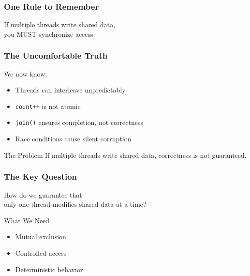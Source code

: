 \documentclass[aspectratio=169,11pt]{beamer}
\begin{document}
	\begin{frame}
		\frametitle{One Rule to Remember}
		\begin{center}
			\Large
			If multiple threads write shared data,\\
			you MUST synchronize access.
		\end{center}
	\end{frame}
	
	
	\begin{frame}
		\frametitle{The Uncomfortable Truth}
		
		We now know:
		
		\begin{itemize}
			\item Threads can interleave unpredictably
			\item \texttt{count++} is not atomic
			\item \texttt{join()} ensures completion, not correctness
			\item Race conditions cause silent corruption
		\end{itemize}
		
		\vspace{6mm}
		
		\begin{block}{The Problem}
			If multiple threads write shared data, correctness is not guaranteed.
		\end{block}
		
	\end{frame}
	\begin{frame}
		\frametitle{The Key Question}
		
		\begin{center}
			\Large
			How do we guarantee that\\
			only one thread modifies shared data at a time?
		\end{center}
		
		\vspace{8mm}
		
		\begin{block}{What We Need}
			\begin{itemize}
				\item Mutual exclusion
				\item Controlled access
				\item Deterministic behavior
			\end{itemize}
		\end{block}
		
	\end{frame}
\end{document}
